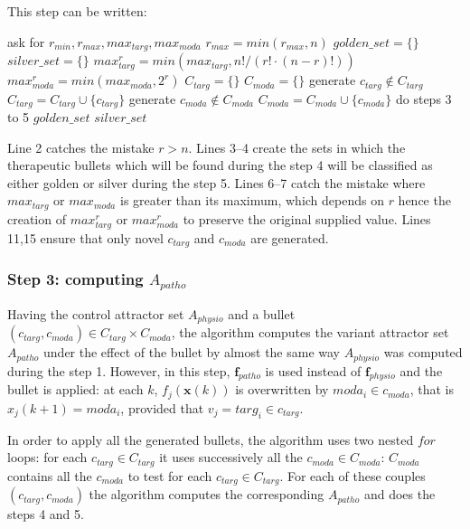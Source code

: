 \documentclass[oneside,a4paper,onecolumn,notitlepage]{article}
\begin{document}
This step can be written:
\begin{algorithmic}[1]
\STATE ask for $r_{min},r_{max},max_{targ},max_{moda}$
\STATE $r_{max}=min(r_{max},n)$
\STATE $golden\_set=\lbrace \rbrace$
\STATE $silver\_set=\lbrace \rbrace$
    \STATE $max_{targ}^{r}=min(max_{targ},n!/(r!\cdot (n-r)!))$
    \STATE $max_{moda}^{r}=min(max_{moda},2^{r})$
    \STATE $C_{targ}=\lbrace \rbrace$
    \STATE $C_{moda}=\lbrace \rbrace$
        \STATE generate $c_{targ}\notin C_{targ}$
        \STATE $C_{targ}=C_{targ}\cup \lbrace c_{targ}\rbrace$
    \ENDWHILE
        \STATE generate $c_{moda}\notin C_{moda}$
        \STATE $C_{moda}=C_{moda}\cup \lbrace c_{moda}\rbrace$
    \ENDWHILE
    \STATE do steps 3 to 5
\ENDFOR
\RETURN $golden\_set$
\RETURN $silver\_set$
\end{algorithmic}
Line 2 catches the mistake $r>n$. Lines 3--4 create the sets in which the therapeutic bullets which will be found during the step 4 will be classified as either golden or silver during the step 5. Lines 6--7 catch the mistake where $max_{targ}$ or $max_{moda}$ is greater than its maximum, which depends on $r$ hence the creation of $max_{targ}^{r}$ or $max_{moda}^{r}$ to preserve the original supplied value. Lines 11,15 ensure that only novel $c_{targ}$ and $c_{moda}$ are generated.

\subsubsection{Step 3: computing $A_{patho}$}
Having the control attractor set $A_{physio}$ and a bullet $(c_{targ},c_{moda})\in C_{targ}\times C_{moda}$, the algorithm computes the variant attractor set $A_{patho}$ under the effect of the bullet by almost the same way $A_{physio}$ was computed during the step 1. However, in this step, $\boldsymbol{f}_{patho}$ is used instead of $\boldsymbol{f}_{physio}$ and the bullet is applied: at each $k$, $f_j(\boldsymbol{x}(k))$ is overwritten by $moda_i\in c_{moda}$, that is $x_j(k+1)=moda_i$, provided that $v_j=targ_i\in c_{targ}$.

In order to apply all the generated bullets, the algorithm uses two nested $for$ loops: for each $c_{targ}\in C_{targ}$ it uses successively all the $c_{moda}\in C_{moda}$: $C_{moda}$ contains all the $c_{moda}$ to test for each $c_{targ}\in C_{targ}$. For each of these couples $(c_{targ},c_{moda})$ the algorithm computes the corresponding $A_{patho}$ and does the steps 4 and 5.
\end{document}
